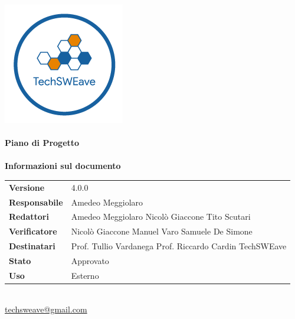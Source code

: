 \documentclass[a4paper]{article}
\begin{document}
\begin{titlepage}
    \begin{center}
        \includegraphics{../../../Images/logo}\\
        \vspace{20px}
        \textcolor{logo}{\hrulefill}\\
        \vspace{20px}
        \textbf{\huge\textcolor{logo}{Piano di Progetto}}\\
        \vspace{10px}
        \textcolor{logo}{\hrulefill}\\
        \vspace{40px}
        \textbf{\Large Informazioni sul documento}\\
        \vspace{20px}
        \begin{tabular}{p{100px} | p{100px}}
            \textbf{Versione}     & 4.0.0                                                                     \\
            \textbf{Responsabile} & Amedeo Meggiolaro                                                         \\
            \textbf{Redattori}    & Amedeo Meggiolaro \newline Nicolò Giaccone \newline Tito Scutari          \\
            \textbf{Verificatore} & Nicolò Giaccone \newline Manuel Varo \newline Samuele De Simone           \\
            \textbf{Destinatari}  & Prof. Tullio Vardanega \newline Prof. Riccardo Cardin \newline TechSWEave \\
            \textbf{Stato}        & Approvato                                                                 \\
            \textbf{Uso}          & Esterno                                                                   \\
        \end{tabular}\\
        \vspace{60px}
        \href{mailto:techsweave@gmail.com}{techsweave@gmail.com}\\
        
    \end{center}
\end{titlepage}
\end{document}
